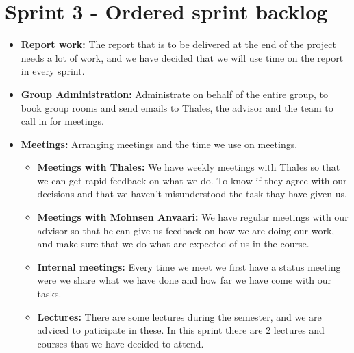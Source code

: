 

\section{Sprint 3 - Ordered sprint backlog}

\begin{itemize}
\item{}\textbf{Report work:} The report that is to be delivered at the end of the project needs a lot of work, and we have decided that we will use time on the report in every sprint.
\item{}\textbf{Group Administration:} Administrate on behalf of the entire group, to book group rooms and send emails to Thales, the advisor and the team to call in for meetings.
\item{}\textbf{Meetings:} Arranging meetings and the time we use on meetings.
\begin{itemize}
\item{}\textbf{Meetings with Thales:} We have weekly meetings with Thales so that we can get rapid feedback on what we do. To know if they agree with our decisions and that we haven't misunderstood the task thay have given us.
\item{}\textbf{Meetings with Mohnsen Anvaari:} We have regular meetings with our advisor so that he can give us feedback on how we are doing our work, and make sure that we do what are expected of us in the course.
\item{}\textbf{Internal meetings:} Every time we meet we first have a status meeting were we share what we have done and how far we have come with our tasks.
\item{}\textbf{Lectures:} There are some lectures during the semester, and we are adviced to paticipate in these. In this sprint there are 2 lectures and courses that we have decided to attend.
\end{itemize}

\newpage



\end{itemize}
